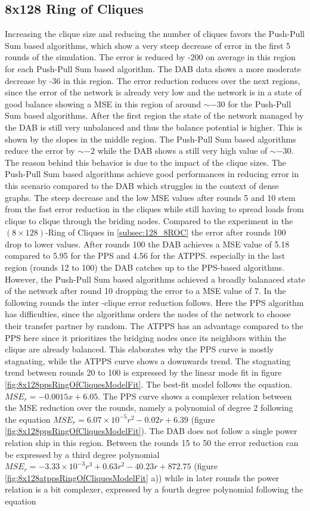 \subsection{8x128 Ring of Cliques}\label{subsec:8_128ROC}
Increasing the clique size and reducing the number of cliques favors the Push-Pull Sum based algorithms, which show a very steep decrease of error in the first 5 rounds of the simulation. The error is reduced by -200 on average in this region for each Push-Pull Sum based algorithm. The DAB data shows a more moderate decrease by -36 in this region. The error reduction reduces over the next regions, since the error of the network is already very low and the network is in a state of good balance showing a MSE in this region of around $\sim -30$ for the Push-Pull Sum based algorithms. After the first region the state of the network managed by the DAB is still very unbalanced and thus the balance potential is higher. This is shown by the slopes in the middle region. The Push-Pull Sum based algorithms reduce the error by $\sim -2$ while the DAB shows a still very high value of $\sim -30$. The reason behind this behavior is due to the impact of the clique sizes. The Push-Pull Sum based algorithms achieve good performances in reducing error in this scenario compared to the DAB which struggles in the context of dense graphs. The steep decrease and the low MSE values after rounds 5 and 10 stem from the fast error reduction in the cliques while still having to spread loads from clique to clique through the briding nodes. Compared to the experiment in the $(8 \times 128)$-Ring of Cliques in \ref{subsec:128_8ROC} the error after rounds 100 drop to lower values. After rounds 100 the DAB achieves a MSE value of 5.18 compared to 5.95 for the PPS and 4.56 for the ATPPS. especially in the last region (rounds 12 to 100) the DAB catches up to the PPS-based algorithms. However, the Push-Pull Sum based algorithms achieved a broadly balanaced state of the network after round 10 dropping the error to a MSE value of 7. In the following rounds the inter -clique error reduction follows. Here the PPS algorithm has difficulties, since the algorithms orders the nodes of the network to choose their transfer partner by random. The ATPPS has an advantage compared to the PPS here since it prioritizes the bridging nodes once its neighbors within the clique are already balanced. This elaborates why the PPS curve is mostly stagnating, while the ATPPS curve shows a downwards trend. The stagnating trend between rounds 20 to 100 is expressed by the linear mode fit in figure \ref{fig:8x128ppsRingOfCliquesModelFit}. The best-fit model follows the equation. $MSE_r=-0.0015x+6.05$. The PPS curve shows a complexer relation between the MSE reduction over the rounds, namely a polynomial of degree 2 following the equation $MSE_r=6.07\times 10^{-5}r^{2}-0.02r+6.39$ (figure \ref{fig:8x128ppsRingOfCliquesModelFit}). The DAB does not follow a single power relation ship in this region. Between the rounds 15 to 50 the error reduction can be expressed by a third degree polynomial $MSE_r=-3.33\times 10^{-3}r^{3}+0.63r^{2}-40.23r+872.75$ (figure \ref{fig:8x128atppsRingOfCliquesModelFit} a)) while in later rounds the power relation is a bit complexer, expressed by a fourth degree polynomial following the equation 